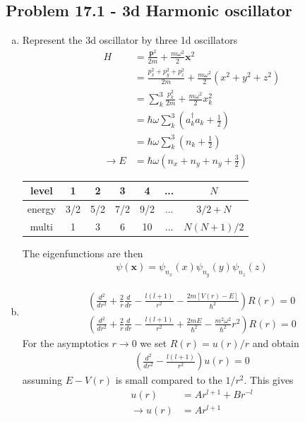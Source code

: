 \documentclass[10pt,a4paper]{book}
\theoremstyle{definition}
\begin{document}
\subsection{Problem 17.1 - 3d Harmonic oscillator}
\begin{enumerate}[(a)]
\item Represent the 3d oscillator by three 1d oscillators
\begin{align}
H&=\frac{\mathbf{p}^2}{2m}+\frac{m\omega^2}{2}\mathbf{x}^2\\
&=\frac{p_x^2+p_y^2+p_z^2}{2m}+\frac{m\omega^2}{2}(x^2+y^2+z^2)\\
&=\sum_k^3\frac{p_k^2}{2m}+\frac{m\omega^2}{2}x_k^2\\
&=\hbar\omega\sum_k^3\left(a_k^\dagger a_k+\frac{1}{2}\right)\\
&=\hbar\omega\sum_k^3\left(n_k+\frac{1}{2}\right)\\
\rightarrow E&=\hbar\omega\left(n_x+n_y+n_y+\frac{3}{2}\right)
\end{align}
\begin{center}
\begin{tabular}{|c|c|c|c|c|c|c|}
\hline 
level & 1 & 2 & 3 & 4 &... & $N$ \\ 
\hline\hline
energy & 3/2 & 5/2 & 7/2 & 9/2 &... & $3/2+N$ \\ 
\hline 
multi & 1 & 3 & 6 & 10 &... & $N(N+1)/2$ \\ 
\hline 
\end{tabular} 
\end{center}
The eigenfunctions are then
\begin{align}
\psi(\mathbf{x})=\psi_{n_x}(x)\psi_{n_y}(y)\psi_{n_z}(z)
\end{align}

\item
\begin{align}
\left(\frac{d^2}{dr^2}+\frac{2}{r}\frac{d}{dr}-\frac{l(l+1)}{r^2}-\frac{2m[V(r)-E]}{\hbar^2}\right)R(r)=0\\
\left(\frac{d^2}{dr^2}+\frac{2}{r}\frac{d}{dr}-\frac{l(l+1)}{r^2}+\frac{2mE}{\hbar^2}-\frac{m^2\omega^2}{\hbar^2}r^2\right)R(r)=0
\end{align}
For the asymptotics $r\rightarrow0$ we set $R(r)=u(r)/r$ and obtain
\begin{align}
\left(\frac{d^2}{dr^2}-\frac{l(l+1)}{r^2}\right)u(r)=0
\end{align}
assuming $E-V(r)$ is small compared to the $1/r^2$. This gives 
\begin{align}
u(r)&=Ar^{l+1}+Br^{-l}\\
\rightarrow u(r)&=Ar^{l+1}
\end{align}


\end{enumerate}
\end{document}
